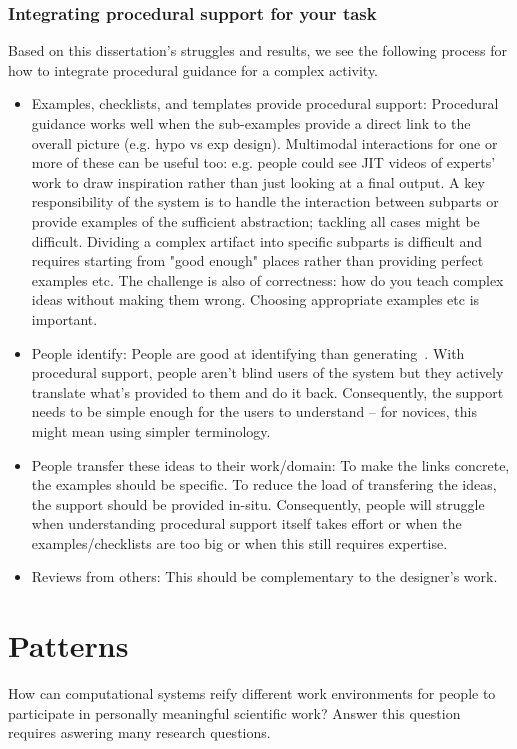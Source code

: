 \subsubsection{Integrating procedural support for your task}
Based on this dissertation's struggles and results, we see the following process for how to integrate procedural guidance for a complex activity.
\begin{itemize}
\item Examples, checklists, and templates provide procedural support: Procedural guidance works well when the sub-examples provide a direct link to the overall picture (e.g. hypo vs exp design).  Multimodal interactions for one or more of these can be useful too: e.g. people could see JIT videos of experts' work to draw inspiration rather than just looking at a final output. A key responsibility of the system is to handle the interaction between subparts or  provide examples of the sufficient abstraction; tackling all cases might be difficult. Dividing a complex artifact into specific subparts is difficult and requires starting from "good enough" places rather than providing perfect examples etc. The challenge is also of correctness: how do you teach complex ideas without making them wrong. Choosing appropriate examples etc is important.
\item People identify: People are good at identifying than generating~\cite{Stahl2006}. With procedural support, people aren’t blind users of the system but they actively translate what’s provided to them and do it back. Consequently, the support needs to be simple enough for the users to understand -- for novices, this might mean using simpler terminology. 
\item People transfer these ideas to their work/domain: To make the links concrete, the examples should be specific. To reduce the load of transfering the ideas, the support should be provided in-situ. Consequently, people will struggle when understanding procedural support itself takes effort or when the examples/checklists are too big or when this still requires expertise. 
\item Reviews from others: This should be complementary to the designer's work.
\end{itemize}


\section{Patterns} 
How can computational systems reify different work environments for people to participate in personally meaningful scientific work? Answer this question requires aswering many research questions.

